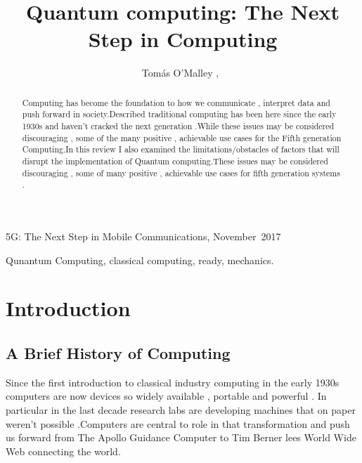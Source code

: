 \documentclass[journal]{IEEEtran}
\begin{document}
%
{5G: The Next Step in Mobile Communications, November~2017}

\title{Quantum computing: The Next Step in Computing}
\author{Tomás O'Malley ,~%
}

\maketitle

\begin{abstract}
 Computing has become the foundation to how we communicate , interpret data and push forward in society.Described traditional computing has been here since the early 1930s  and haven't cracked the next generation .While these issues may be considered discouraging , some of the many positive ,  achievable  use cases for the Fifth generation Computing.In this review I also examined the limitations/obstacles of factors that will disrupt the implementation of Quantum computing.These issues may be considered discouraging , some of many positive , achievable  use cases for fifth generation systems .

\end{abstract}
\begin{IEEEkeywords}
Qunantum Computing, classical computing, ready, mechanics.
\end{IEEEkeywords}

\section{Introduction}


\subsection{A Brief History of Computing }

Since the first  introduction to classical industry computing in the early 1930s computers are now devices so widely available ,  portable and powerful . In particular in the last decade research  labs are developing machines that on paper weren't possible .Computers are central to role in that transformation and push us forward from The Apollo Guidance Computer to Tim Berner lees World Wide Web connecting the world. 
\end{document}
